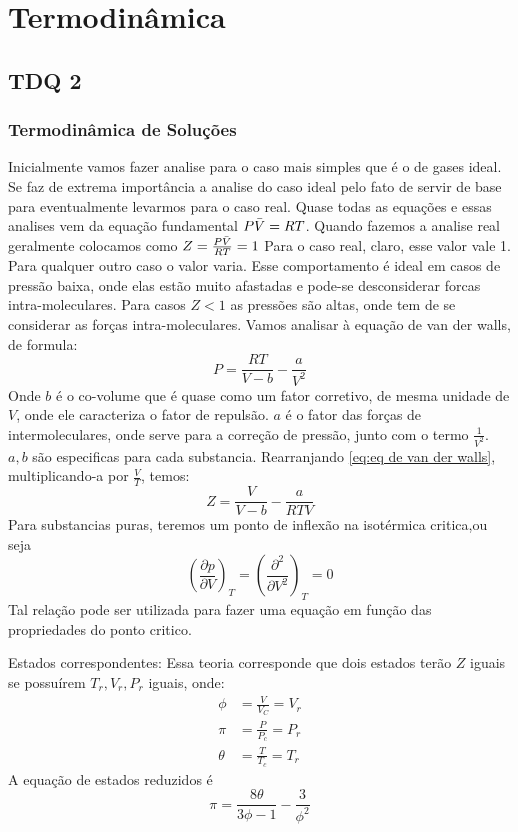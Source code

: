 \chapter{Termodinâmica}
\section{TDQ 2}
\subsection{Termodinâmica de Soluções}
Inicialmente vamos fazer analise para o caso mais simples que é o de gases ideal. Se faz de extrema
importância a analise do caso ideal pelo fato de servir de base para eventualmente levarmos para o
caso real. Quase todas as equações e essas analises vem da equação fundamental \(P\Bar{V}=RT\).
Quando fazemos a analise real geralmente colocamos como \(Z=\frac{P\Bar{V}}{RT}=1\) Para o caso
real, claro, esse valor vale 1. Para qualquer outro caso o valor varia. Esse comportamento é ideal
em casos de pressão baixa, onde elas estão muito afastadas e pode-se desconsiderar forcas
intra-moleculares. Para casos \(Z<1\) as pressões são altas, onde tem de se considerar as forças
intra-moleculares. Vamos analisar à equação de van der walls, de formula:
\begin{equation}\label{eq:eq de van der walls}
    P=\frac{RT}{V-b}-\frac{a}{V^2}
\end{equation}
Onde \(b\) é o co-volume que é quase como um fator corretivo, de mesma unidade de \(V\), onde ele
caracteriza o fator de repulsão. \(a\) é o fator das forças de intermoleculares, onde serve para a
correção de pressão, junto com o termo \(\frac{1}{V^2}\). \(a,b\) são especificas para cada
substancia. Rearranjando \eqref{eq:eq de van der walls}, multiplicando-a por \(\frac{V}{T}\), temos:
\begin{equation}
    Z=\frac{V}{V-b}-\frac{a}{RTV}
\end{equation}
Para substancias puras, teremos um ponto de inflexão na isotérmica critica,ou seja
\begin{equation}
    (\frac{\partial p}{\partial V})_T=(\frac{\partial^2}{\partial V^2})_T=0
\end{equation}
Tal relação pode ser utilizada para fazer uma equação em função das propriedades do ponto critico.
\par

Estados correspondentes: Essa teoria corresponde que dois estados terão \(Z\) iguais se possuírem
\(T_r,V_r,P_r\) iguais, onde:
\begin{align}
    \phi&=\frac{V}{V_C}=V_r\\
    \pi&=\frac{P}{P_c}=P_r\\
    \theta&=\frac{T}{T_c}=T_r
\end{align}
A equação de estados reduzidos é
\begin{equation}\label{eq:eq dos gases correspondentes}
    \pi=\frac{8 \theta}{3 \phi -1} - \frac{3}{\phi^2} 
\end{equation}
